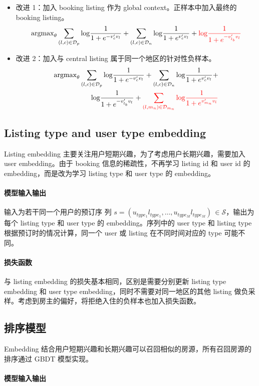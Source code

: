 \begin{itemize}
  \item 改进 1：加入 booking listing 作为 global context。正样本中加入最终的
    booking listing。
    \begin{equation}
      \mathrm{argmax}_{\theta} \sum_{(l, c) \in \mathcal{D}_{p}} \mathrm{log} \frac{1}{1 + e^{-v'_c v_l}} + \sum_{(l, c) \in \mathcal{D}_{n}} \mathrm{log} \frac{1}{1 + e^{v'_c v_l}} + {\color{red}{\mathrm{log} \frac{1}{1 + e^{-v'_{l_b}v_l}}}}
    \end{equation}
  \item 改进 2：加入与 central listing 属于同一个地区的针对性负样本。
    \begin{equation}
    \begin{split}
      \mathrm{argmax}_{\theta} \sum_{(l, c) \in \mathcal{D}_{p}} \mathrm{log} \frac{1}{1 + e^{-v'_c v_l}} + \sum_{(l, c) \in \mathcal{D}_{n}} \mathrm{log} \frac{1}{1 + e^{v'_c v_l}} + \\ {\mathrm{log} \frac{1}{1 + e^{-v'_{l_b}v_l}}} + {\color{red}{\sum_{(l, m_n) \in \mathcal{D}_{m_n}} \mathrm{log} \frac{1}{1 + e^{v'_{m_n} v_l}}}}
    \end{split}
  \end{equation}
\end{itemize} 

\subsection{Listing type and user type embedding}
Listing embedding 主要关注用户短期兴趣，为了考虑用户长期兴趣，需要加入 user
embedding。由于 booking 信息的稀疏性，不再学习 listing id 和 user
id 的 embedding，而是改为学习 listing type 和 user type 的 embedding。

\paragraph{模型输入输出} 输入为若干同一个用户的预订序
列 $s=(u_{type_1}l_{type_1}, \ldots, u_{type_M}l_{type_M}) \, \in \mathcal{S}$，输出为
每个 listing type 和 user type 的 embedding。序列中的 user type 和 listing type
根据预订时的情况计算，同一个 user 或 listing 在不同时间对应的 type 可能不同。

\paragraph{损失函数} 与 listing embedding 的损失基本相同，区别是需要分别更新
listing type embedding 和 user type embedding，同时不需要对同一地区的其他
listing 做负采样。考虑到房主的偏好，将拒绝入住的负样本也加入损失函数。

\subsection{排序模型}
Embedding 结合用户短期兴趣和长期兴趣可以召回相似的房源，所有召回房源的排序通过
GBDT 模型实现。
\paragraph{模型输入输出}

